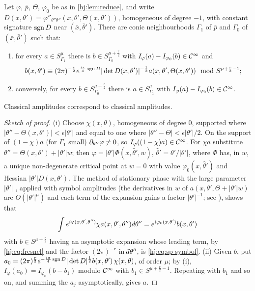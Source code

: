\begin{proposition}\label{hj:prop:sp-reduction}
  Let $\varphi$, $\bar p$, $\Theta$, $\varphi_0$ be as in \cref{hj:lem:reduce},
  and write $D(x,\theta')=\varphi''_{\theta''\theta''}(x,\theta',\Theta(x,\theta'))$,
  homogeneous of degree $-1$, with constant signature $\operatorname{sgn} D$ near
  $(\bar x,\bar\theta')$.  There are conic neighbourhoods $\Gamma_1$ of $\bar p$ and
  $\Gamma_0$ of $(\bar x,\bar\theta')$ such that:
  \begin{enumerate}[label=(\roman*)]
  \item for every $a\in S^\mu_{\Gamma_1}$ there is $b\in S^{\mu+\frac r2}_{\Gamma_0}$
    with $I_\varphi(a)-I_{\varphi_0}(b)\in\mathcal{C}^\infty$ and
    \begin{equation}\label{hj:eq:sp-symbol}
      b(x,\theta')\equiv(2\pi)^{-\frac r2}e^{\frac{i\pi}4\operatorname{sgn} D}
      |\det D(x,\theta')|^{-\frac12}a(x,\theta',\Theta(x,\theta'))
      \mod S^{\mu+\frac r2-1};
    \end{equation}
  \item conversely, for every $b\in S^{\mu+\frac r2}_{\Gamma_0}$ there is
    $a\in S^\mu_{\Gamma_1}$ with $I_\varphi(a)-I_{\varphi_0}(b)\in\mathcal{C}^\infty$.
  \end{enumerate}
  Classical amplitudes correspond to classical amplitudes.
\end{proposition}
\begin{proof}[Sketch of proof]
  (i) Choose $\chi(x,\theta)$, homogeneous of degree $0$, supported where
  $|\theta''-\Theta(x,\theta')|<\epsilon|\theta'|$ and equal to one where
  $|\theta''-\Theta|<\epsilon|\theta'|/2$.  On the support of $(1-\chi)a$ (for
  $\Gamma_1$ small) $\partial_{\theta''}\varphi\ne0$, so $I_\varphi((1-\chi)a)\in\mathcal{C}^\infty$.
  For $\chi a$ substitute $\theta''=\Theta(x,\theta')+|\theta'|w$; then
  $\varphi=|\theta'|\Phi(x,\hat\theta',w)$, $\hat\theta'=\theta'/|\theta'|$, where
  $\Phi$ has, in $w$, a unique non-degenerate critical point at $w=0$ with value
  $\varphi_0(x,\hat\theta')$ and Hessian $|\theta'|D(x,\theta')$.  The method of
  stationary phase with the large parameter $|\theta'|$
  \cite[Theorem~7.7.5]{Hormander-I}, applied with symbol amplitudes (the
  derivatives in $w$ of $a(x,\theta',\Theta+|\theta'|w)$ are $O(|\theta'|^{\mu})$
  and each term of the expansion gains a factor $|\theta'|^{-1}$; see
  \cite[Section~25.1]{Hormander-IV}), shows that
  \begin{equation*}
    \int e^{i\varphi(x,\theta',\theta'')}\chi a(x,\theta',\theta'')\,\dbar\theta''
    =e^{i\varphi_0(x,\theta')}b(x,\theta')
  \end{equation*}
  with $b\in S^{\mu+\frac r2}$ having an asymptotic expansion whose leading term,
  by \eqref{hj:eq:fresnel} and the factor $(2\pi)^{-r}$ in $\dbar\theta''$, is
  \eqref{hj:eq:sp-symbol}.  (ii) Given $b$, put
  $a_0=(2\pi)^{\frac r2}e^{-\frac{i\pi}4\operatorname{sgn} D}|\det D|^{\frac12}b(x,\theta')\,
  \chi(x,\theta)$, of order $\mu$; by (i), $I_\varphi(a_0)=I_{\varphi_0}(b-b_1)$
  modulo $\mathcal{C}^\infty$ with $b_1\in S^{\mu+\frac r2-1}$.  Repeating with $b_1$ and so on,
  and summing the $a_j$ asymptotically, gives $a$.
\end{proof}

